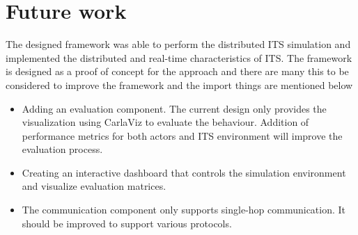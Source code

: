 \section{Future work}
The designed framework was able to perform the distributed ITS simulation and implemented the distributed and real-time characteristics of ITS. The framework is designed as a proof of concept for the approach and there are many this to be considered to improve the framework and the import things are mentioned below
\begin{itemize}
    \item Adding an evaluation component. The current design only provides the visualization using CarlaViz to evaluate the behaviour. Addition of performance metrics for both actors and ITS environment will improve the evaluation process.
    \item Creating an interactive dashboard that controls the simulation environment and visualize evaluation matrices.
    \item The communication component only supports single-hop communication. It should be improved to support various protocols.
\end{itemize}